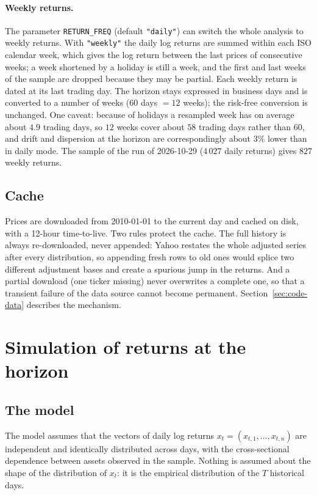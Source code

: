 \documentclass[11pt,a4paper]{article}
\newcommand{\code}[1]{\texttt{#1}}
\theoremstyle{plain}
\theoremstyle{remark}
\begin{document}
\paragraph{Weekly returns.} The parameter \code{RETURN\_FREQ} (default
\code{"daily"}) can switch the whole analysis to weekly returns. With
\code{"weekly"} the daily log returns are summed within each ISO calendar
week, which gives the log return between the last prices of consecutive
weeks; a week shortened by a holiday is still a week, and the first and last
weeks of the sample are dropped because they may be partial. Each weekly
return is dated at its last trading day. The horizon stays expressed in
business days and is converted to a number of weeks ($60$ days $= 12$
weeks); the risk-free conversion is unchanged. One caveat: because of
holidays a resampled week has on average about $4.9$ trading days, so $12$
weeks cover about $58$ trading days rather than $60$, and drift and
dispersion at the horizon are correspondingly about $3\%$ lower than in
daily mode. The sample of the run of 2026-10-29 ($4\,027$ daily returns)
gives $827$ weekly returns.

\subsection{Cache}

Prices are downloaded from 2010-01-01 to the current day and cached on disk,
with a 12-hour time-to-live. Two rules protect the cache. The full history
is always re-downloaded, never appended: Yahoo restates the whole adjusted
series after every distribution, so appending fresh rows to old ones would
splice two different adjustment bases and create a spurious jump in the
returns. And a partial download (one ticker missing) never overwrites a
complete one, so that a transient failure of the data source cannot become
permanent. Section~\ref{sec:code-data} describes the mechanism.

\section{Simulation of returns at the horizon}
\label{sec:simulation}

\subsection{The model}

The model assumes that the vectors of daily log returns
$x_t = (x_{t,1},\dots,x_{t,n})$ are independent and identically distributed
across days, with the cross-sectional dependence between assets observed in
the sample. Nothing is assumed about the shape of the distribution of
$x_t$: it is the empirical distribution of the $T$ historical days.
\end{document}
